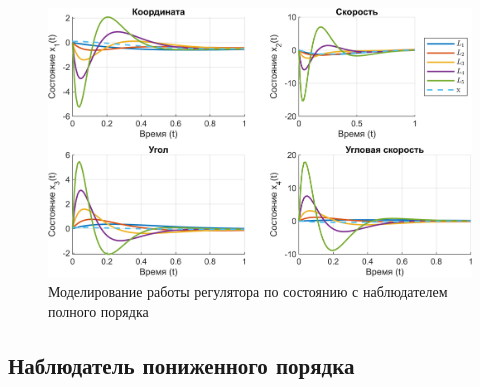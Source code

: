 \begin{figure}[H]
    \centering
    \includegraphics[width=\linewidth]{figs/3.3.full.png}
    \caption{Моделирование работы регулятора по состоянию 
    с наблюдателем полного порядка}
    \label{fig:3.3.full}
\end{figure}

\subsection{Наблюдатель пониженного порядка}
\label{sec:3.3.red}

